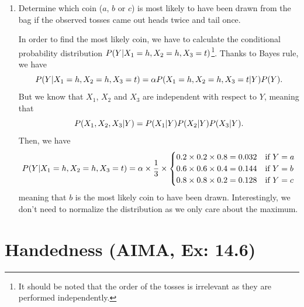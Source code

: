 \documentclass[11pt, a4paper]{article}
\begin{document}
\begin{enumerate}
\begin{solution}
        \vspace{1ex}
    \end{solution}
    
    \item Determine which coin ($a$, $b$ or $c$) is most likely to have been drawn from the bag if the observed tosses came out heads twice and tail once.
    
    \begin{solution}
        In order to find the most likely coin, we have to calculate the conditional probability distribution $P(Y \vert X_1 = h, X_2 = h, X_3 = t)$\footnote{It should be noted that the order of the tosses is irrelevant as they are performed independently.}. Thanks to Bayes rule, we have
        \begin{equation*}
        P(Y \vert X_1 = h, X_2 = h, X_3 = t) = \alpha P(X_1 = h, X_2 = h, X_3 = t \vert Y) P(Y).
        \end{equation*}
        But we know that $X_1$, $X_2$ and $X_3$ are independent with respect to $Y$, meaning that
        \begin{equation*}
            P(X_1, X_2, X_3 \vert Y) = P(X_1 \vert Y) P(X_2 \vert Y) P(X_3 \vert Y).
        \end{equation*}
        Then, we have
        \begin{equation*}
            P(Y \vert X_1 = h, X_2 = h, X_3 = t) = \alpha \times \frac{1}{3} \times \begin{cases}
                0.2 \times 0.2 \times 0.8 = \num{0.032} & \text{if } Y = a \\
                0.6 \times 0.6 \times 0.4 = \num{0.144} & \text{if } Y = b \\
                0.8 \times 0.8 \times 0.2 = \num{0.128} & \text{if } Y = c \\
            \end{cases}
        \end{equation*}
        meaning that $b$ is the most likely coin to have been drawn. Interestingly, we don't need to normalize the distribution as we only care about the maximum.
    \end{solution}
\end{enumerate}

\newpage

\section{Handedness (AIMA, Ex: 14.6)}
\end{document}
